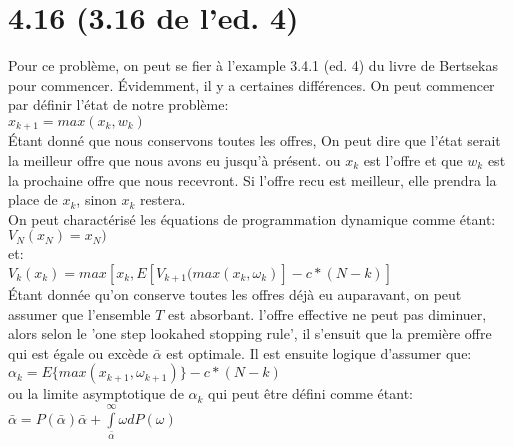 \documentclass[oneside]{book}
\begin{document}
\section*{4.16 (3.16 de l'ed. 4)}
Pour ce problème, on peut se fier à l'example 3.4.1 (ed. 4) du livre de Bertsekas pour commencer. Évidemment, il y a certaines différences. On peut commencer par définir l'état de notre problème:\\

$x_{k+1} = max(x_k, w_k)$\\

Étant donné que nous conservons toutes les offres, On peut dire que l'état serait la meilleur offre que nous avons eu jusqu'à présent. ou $x_k$ est l'offre et que $w_k$ est la prochaine offre que nous recevront. Si l'offre recu est meilleur, elle prendra la place de $x_k$, sinon $x_k$ restera.\\

On peut charactérisé les équations de programmation dynamique comme étant:\\

$V_N(x_N) = x_N)$\\

et:\\

$V_k(x_k) = max[x_k ,E[V_{k+1}(max(x_k,\omega_k)] - c*(N-k) ]$\\

Étant donnée qu'on conserve toutes les offres déjà eu auparavant, on peut assumer que l'ensemble $T$ est absorbant. l'offre effective ne peut pas diminuer, alors selon le 'one step lookahed stopping rule', il s'ensuit que la première offre qui est égale ou excède $\bar{\alpha}$ est optimale. Il est ensuite logique d'assumer que:\\

$\alpha_k = E\{max(x_{k+1},\omega_{k+1})\} - c*(N-k)$\\

ou la limite asymptotique de $\alpha_k$ qui peut être défini comme étant:\\

$\bar{\alpha} = P(\bar{\alpha})\bar{\alpha} + \int\limits_{\bar{\alpha}}^{\infty}\omega dP(\omega)$
\end{document}
